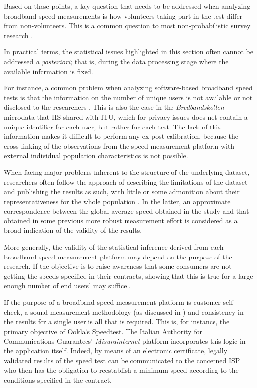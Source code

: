 \documentclass[12pt]{article}
\begin{document}
Based on these points, a key question that needs to be addressed when analyzing broadband speed measurements is how volunteers taking part in the test differ from non-volunteers. This is a common question to most non-probabilistic survey research \citep{couper2013}. 

In practical terms, the statistical issues highlighted in this section often cannot be addressed \textit{a posteriori}; that is, during the data processing stage where the available information is fixed. 

For instance, a common problem when analyzing software-based broadband speed tests is that the information on the number of unique users is not available or not disclosed to the researchers \citep{canadi2012}. This is also the case in the \textit{Bredbandskollen} microdata that IIS shared with ITU, which for privacy issues does not contain a unique identifier for each user, but rather for each test. The lack of this information makes it difficult to perform any ex-post calibration, because the cross-linking of the observations from the speed measurement platform with external individual population characteristics is not possible.

When facing major problems inherent to the structure of the underlying dataset, researchers often follow the approach of describing the limitations of the dataset and publishing the results as such, with little \citep{prasad2016,wattegama2011,chetty2013} or some admonition about their representativeness for the whole population \citep{canadi2012,riddlesden2014}. In the latter, an approximate correspondence between the global average speed obtained in the study and that obtained in some previous more robust measurement effort is considered as a broad indication of the validity of the results.   
   
More generally, the validity of the statistical inference derived from each broadband speed measurement platform may depend on the purpose of the research. If the objective is to raise awareness that some consumers are not getting the speeds specified in their contracts, showing that this is true for a large enough number of end users' may suffice \citep{chetty2013,wattegama2011}. 

If the purpose of a broadband speed measurement platform is customer self-check, a sound measurement methodology (as discussed in ) and consistency in the results for a single user is all that is required. This is, for instance, the primary objective of Ookla's Speedtest. The Italian Authority for Communications Guarantees' \textit{Misurainternet} platform incorporates this logic in the application itself. Indeed, by means of an electronic certificate, legally validated results of the speed test can be communicated to the concerned ISP who then has the obligation to reestablish a minimum speed according to the conditions specified in the contract.
\end{document}
